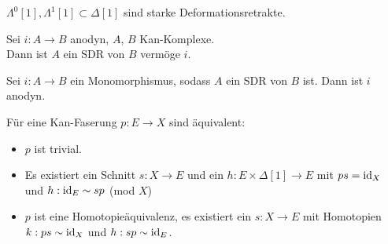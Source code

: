 \documentclass{cheat-sheet}
\newenvironment{centertikzcd}
  {\begin{center}\begin{tikzcd}}
  {\end{tikzcd}\end{center}}
\begin{document}
\begin{bspe}
  $\Lambda^0[1], \Lambda^1[1] \subset \Delta[1]$ sind starke Deformationsretrakte.
\end{bspe}

\begin{prop}
  Sei $i : A \to B$ anodyn, $A$, $B$ Kan-Komplexe. \\
  Dann ist $A$ ein SDR von $B$ vermöge $i$.
\end{prop}


\begin{prop}
  Sei $i : A \to B$ ein Monomorphismus, sodass $A$ ein SDR von $B$ ist.
  Dann ist $i$ anodyn.
\end{prop}

\begin{prop}
  Für eine Kan-Faserung $p : E \to X$ sind äquivalent:
  \begin{itemize}
    \item $p$ ist trivial.
    \item Es existiert ein Schnitt $s : X \to E$ und ein $h : E \times \Delta[1] \to E$ mit $ps = \operatorname{id}_X$ und $h : \operatorname{id}_E \sim sp$ (mod $X$)
    \item $p$ ist eine Homotopieäquivalenz, \dh{} es existiert ein $s : X \to E$ mit Homotopien $k : ps \sim \operatorname{id}_X$ und $h : sp \sim \operatorname{id}_E$.
  \end{itemize}
\end{prop}


\end{document}
